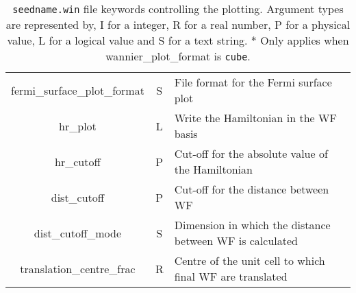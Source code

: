 \begin{table}
\begin{center}
\begin{tabular}{|c|c|p{6cm}|}
  {\sc fermi\_surface\_plot\_format }   & S & File format for the Fermi
  surface plot \\
  {\sc hr\_plot} & L & Write the Hamiltonian in the WF basis \\
  {\sc hr\_cutoff} & P &  Cut-off for the absolute value of the Hamiltonian \\
  {\sc dist\_cutoff} & P & Cut-off for the distance between WF \\
  {\sc dist\_cutoff\_mode} & S & Dimension in which the distance between WF
  is calculated \\
  {\sc translation\_centre\_frac } & R & Centre of the unit cell to which
  final WF are translated \\ 
\hline
\end{tabular}
\caption[Parameter file keywords controlling plotting.]
{{\tt seedname.win} file keywords controlling the  plotting.  Argument types
are represented by, I for a integer, R for a real number, P for a
physical value, L for a logical value and S for a text string. * Only
applies when {\sc wannier\_plot\_format} is {\tt cube}.}
\label{parameter_keywords6}
\end{center}
\end{table}



